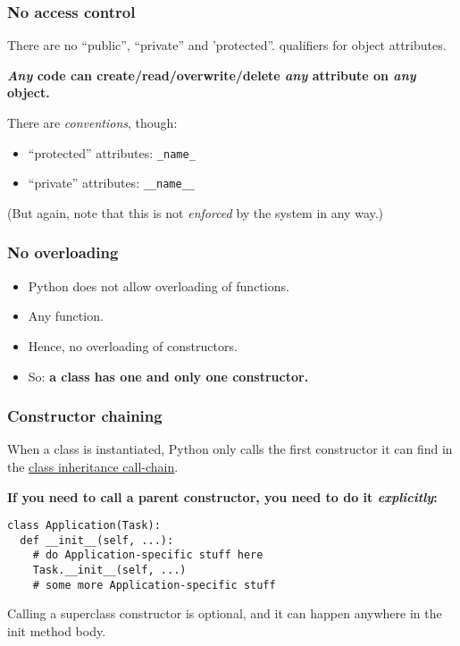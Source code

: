 \begin{frame}
  \frametitle{No access control}
  There are no ``public'', ``private'' and 'protected''. qualifiers for object
  attributes.

  
  \textbf{\emph{Any} code can create/read/overwrite/delete \emph{any} attribute on
    \emph{any} object.}

  
  There are \emph{conventions}, though:
  \begin{itemize}
  \item ``protected'' attributes: \texttt{\_name\_}
  \item ``private'' attributes: \texttt{\_\_name\_\_}
  \end{itemize}
  (But again, note that this is not \emph{enforced} by the system in
  any way.)

\end{frame}

 \begin{frame}\frametitle{No overloading}

\begin{itemize}
\item Python does not allow overloading of functions.
\item Any function.
\item Hence, no overloading of constructors.
\item So: \textbf{a class has one and only one constructor.}
\end{itemize}
 \end{frame}


\begin{frame}[fragile]\frametitle{Constructor chaining}

    When a class is instantiated, Python only calls the first
    constructor it can find in the
    \href{http://www.python.org/download/releases/2.3/mro/}{class inheritance call-chain}.

    \textbf{If you need to call a parent constructor, you need
      to do it \emph{explicitly}:}
    \begin{lstlisting}
class Application(Task):
  def __init__(self, ...):
    # do Application-specific stuff here
    Task.__init__(self, ...)
    # some more Application-specific stuff
    \end{lstlisting}

    Calling a superclass constructor is optional, and
    it can happen anywhere in the init method body.
\end{frame}


